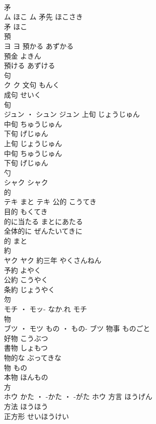 \documentclass[8pt]{extreport}
\begin{document}
\begin{CJK}{UTF8}{min}
\\	矛	
\\	ム	ほこ	ム	矛先	ほこさき	
\\	矛	ほこ	
\\	預	
\\	ヨ		ヨ	預かる	あずかる	
\\	預金	よきん	
\\	預ける	あずける	
\\	句	
\\	ク		ク	文句	もんく	
\\	成句	せいく	
\\	旬	
\\	ジュン ・ シュン		ジュン	上旬	じょうじゅん	
\\	中旬	ちゅうじゅん	
\\	下旬	げじゅん	
\\	上旬	じょうじゅん	
\\	中旬	ちゅうじゅん	
\\	下旬	げじゅん	
\\	勺	
\\	シャク		シャク																																			
\\	的	
\\	テキ	まと	テキ	公的	こうてき	
\\	目的	もくてき	
\\	的に当たる	まとにあたる	
\\	全体的に	ぜんたいてきに	
\\	的	まと	
\\	約	
\\	ヤク		ヤク	約三年	やくさんねん	
\\	予約	よやく	
\\	公約	こうやく	
\\	条約	じょうやく	
\\	勿	
\\	モチ ・ モッ-	なか.れ	モチ																																			
\\	物	
\\	ブツ ・ モツ	もの ・ もの-	ブツ	物事	ものごと	
\\	好物	こうぶつ	
\\	書物	しょもつ	
\\	物的な	ぶってきな	
\\	物	もの	
\\	本物	ほんもの	
\\	方	
\\	ホウ	かた ・ -かた ・ -がた	ホウ	方言	ほうげん	
\\	方法	ほうほう	
\\	正方形	せいほうけい	

\end{CJK}
\end{document}
